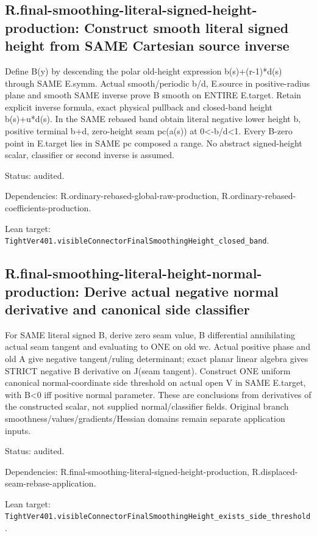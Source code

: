 \documentclass{article}
\begin{document}
\subsection*{R.final-smoothing-literal-signed-height-production: Construct smooth literal signed height from SAME Cartesian source inverse}
Define B(y) by descending the polar old-height expression b(s)+(r-1)*d(s) through SAME E.symm. Actual smooth/periodic b/d, E.source in positive-radius plane and smooth SAME inverse prove B smooth on ENTIRE E.target. Retain explicit inverse formula, exact physical pullback and closed-band height b(s)+u*d(s). In the SAME rebased band obtain literal negative lower height b, positive terminal b+d, zero-height seam pc(a(s)) at 0<-b/d<1. Every B-zero point in E.target lies in SAME pc composed a range. No abstract signed-height scalar, classifier or second inverse is assumed.
\par Status: audited.
\par Dependencies: R.ordinary-rebased-global-raw-production, R.ordinary-rebased-coefficients-production.
\par Lean target: \texttt{TightVer401.visibleConnectorFinalSmoothingHeight\_closed\_band}.
\subsection*{R.final-smoothing-literal-height-normal-production: Derive actual negative normal derivative and canonical side classifier}
For SAME literal signed B, derive zero seam value, B differential annihilating actual seam tangent and evaluating to ONE on old wc. Actual positive phase and old A give negative tangent/ruling determinant; exact planar linear algebra gives STRICT negative B derivative on J(seam tangent). Construct ONE uniform canonical normal-coordinate side threshold on actual open V in SAME E.target, with B<0 iff positive normal parameter. These are conclusions from derivatives of the constructed scalar, not supplied normal/classifier fields. Original branch smoothness/values/gradients/Hessian domains remain separate application inputs.
\par Status: audited.
\par Dependencies: R.final-smoothing-literal-signed-height-production, R.displaced-seam-rebase-application.
\par Lean target: \texttt{TightVer401.visibleConnectorFinalSmoothingHeight\_exists\_side\_threshold}.
\end{document}
